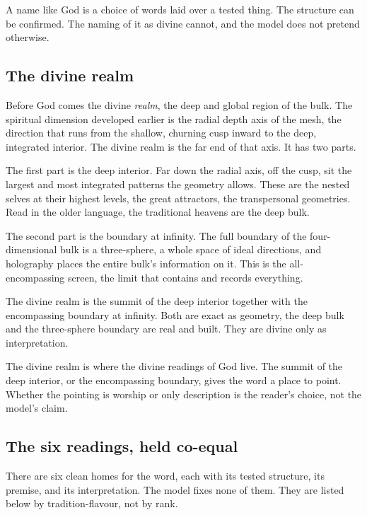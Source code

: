 \begin{principle}
A name like God is a choice of words laid over a tested thing. The structure can be confirmed. The naming of it as divine cannot, and the model does not pretend otherwise.
\end{principle}

\subsection{The divine realm}

Before God comes the divine \emph{realm}, the deep and global region of the bulk. The spiritual dimension developed earlier is the radial depth axis of the mesh, the direction that runs from the shallow, churning cusp inward to the deep, integrated interior. The divine realm is the far end of that axis. It has two parts.

The first part is the deep interior. Far down the radial axis, off the cusp, sit the largest and most integrated patterns the geometry allows. These are the nested selves at their highest levels, the great attractors, the transpersonal geometries. Read in the older language, the traditional heavens are the deep bulk.

The second part is the boundary at infinity. The full boundary of the four-dimensional bulk is a three-sphere, a whole space of ideal directions, and holography places the entire bulk's information on it. This is the all-encompassing screen, the limit that contains and records everything.

\begin{result}
The divine realm is the summit of the deep interior together with the encompassing boundary at infinity. Both are exact as geometry, the deep bulk and the three-sphere boundary are real and built. They are divine only as interpretation.
\end{result}

The divine realm is where the divine readings of God live. The summit of the deep interior, or the encompassing boundary, gives the word a place to point. Whether the pointing is worship or only description is the reader's choice, not the model's claim.

\subsection{The six readings, held co-equal}

There are six clean homes for the word, each with its tested structure, its premise, and its interpretation. The model fixes none of them. They are listed below by tradition-flavour, not by rank.

